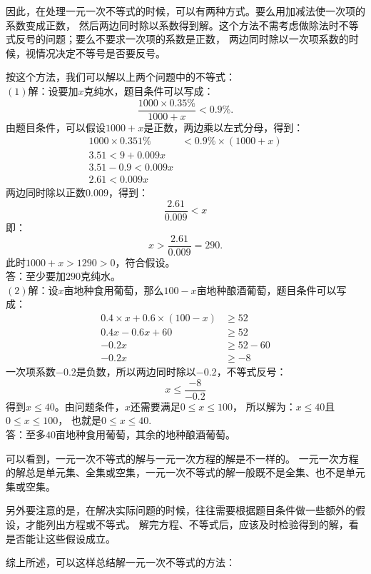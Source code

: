 \documentclass[12pt,UTF8,fontset=none]{ctexbook}
\begin{document}
因此，在处理一元一次不等式的时候，可以有两种方式。要么用加减法使一次项的系数变成正数，
然后两边同时除以系数得到解。这个方法不需考虑做除法时不等式反号的问题；要么不要求一次项的系数是正数，
两边同时除以一次项系数的时候，视情况决定不等号是否要反号。
\begin{so}
    按这个方法，我们可以解以上两个问题中的不等式：\\
    $(1)$解：设要加$x$克纯水，题目条件可以写成：
    $$ \frac{1000 \times 0.35\%}{1000 + x} < 0.9\%.$$
    由题目条件，可以假设$1000+x$是正数，两边乘以左式分母，得到：
    \begin{align*}
        1000 \times 0.351\% &< 0.9\% \times (1000 + x)  \\
        3.51 < 9 + 0.009x  \\
        3.51 - 0.9 < 0.009x  \\
        2.61 < 0.009x 
    \end{align*}
    两边同时除以正数$0.009$，得到：
    $$ \frac{2.61}{0.009} < x$$
    即：
    $$ x > \frac{2.61}{0.009} = 290.$$
    此时$1000+x > 1290 > 0$，符合假设。\\
    答：至少要加$290$克纯水。\\
    $(2)$解：设$x$亩地种食用葡萄，那么$100 - x$亩地种酿酒葡萄，题目条件可以写成：
    \begin{align*}
        0.4 \times x + 0.6 \times (100 - x) &\geqslant 52  \\
        0.4x - 0.6x + 60 &\geqslant 52  \\
        -0.2x &\geqslant 52 - 60  \\
        -0.2x &\geqslant -8 
    \end{align*}
    一次项系数$-0.2$是负数，所以两边同时除以$-0.2$，不等式反号：
    $$ x \leqslant \frac{-8}{-0.2}$$
    得到$x \leqslant 40$。由问题条件，$x$还需要满足$0 \leqslant x \leqslant 100$，
    所以解为：$x \leqslant 40$且$0 \leqslant x \leqslant 100$，
    也就是$0 \leqslant x \leqslant 40$.\\
    答：至多$40$亩地种食用葡萄，其余的地种酿酒葡萄。
\end{so}
可以看到，一元一次不等式的解与一元一次方程的解是不一样的。
一元一次方程的解总是单元集、全集或空集，一元一次不等式的解一般既不是全集、也不是单元集或空集。

另外要注意的是，在解决实际问题的时候，往往需要根据题目条件做一些额外的假设，才能列出方程或不等式。
解完方程、不等式后，应该及时检验得到的解，看是否能让这些假设成立。

综上所述，可以这样总结解一元一次不等式的方法：
\end{document}
